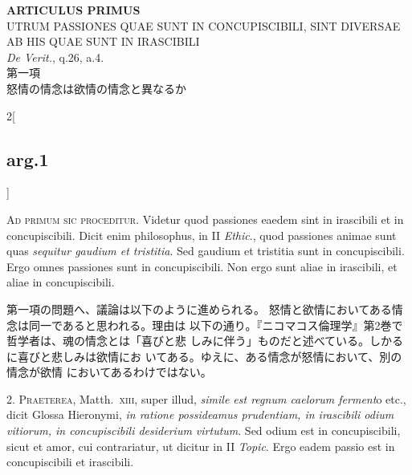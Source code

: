 \documentclass[paper=a4paper,fontsize=10pt,jafontsize=9pt,titlepage]{jlreq}
\begin{document}
\newpage
{}
{}
\setcounter{section}{1}
\setcounter{subsection}{0}

\begin{center}
{\Large {\bfseries ARTICULUS PRIMUS}}\\
{\large UTRUM PASSIONES QUAE SUNT IN CONCUPISCIBILI, SINT DIVERSAE AB
 HIS QUAE SUNT IN IRASCIBILI}\\
{\footnotesize {\itshape De Verit.}, q.26, a.4.}\\
{\Large 第一項\\怒情の情念は欲情の情念と異なるか}
\end{center}

\begin{paracol}{2}[\subsection{arg.1}]

{\scshape Ad primum sic proceditur}. Videtur quod passiones eaedem sint in
irascibili et in concupiscibili. Dicit enim philosophus, in II {\itshape Ethic}.,
quod passiones animae sunt quas {\itshape sequitur gaudium et tristitia}. Sed
gaudium et tristitia sunt in concupiscibili. Ergo omnes passiones sunt
in concupiscibili. Non ergo sunt aliae in irascibili, et aliae in
concupiscibili.

\switchcolumn

第一項の問題へ、議論は以下のように進められる。
怒情と欲情においてある情念は同一であると思われる。理由は
 以下の通り。『ニコマコス倫理学』第2巻で哲学者は、魂の情念とは「喜びと悲
 しみに伴う」ものだと述べている。しかるに喜びと悲しみは欲情にお
 いてある。ゆえに、ある情念が怒情において、別の情念が欲情
においてあるわけではない。


2. {\scshape Praeterea}, Matth.~{\scshape xiii}, super illud, {\itshape simile est regnum caelorum ferment}o
etc., dicit Glossa Hieronymi, {\itshape in ratione possideamus prudentiam, in
irascibili odium vitiorum, in concupiscibili desiderium virtutum}. Sed
odium est in concupiscibili, sicut et amor, cui contrariatur, ut dicitur
in II {\itshape Topic}. Ergo eadem passio est in concupiscibili et irascibili.

\switchcolumn


\end{paracol}
\end{document}

